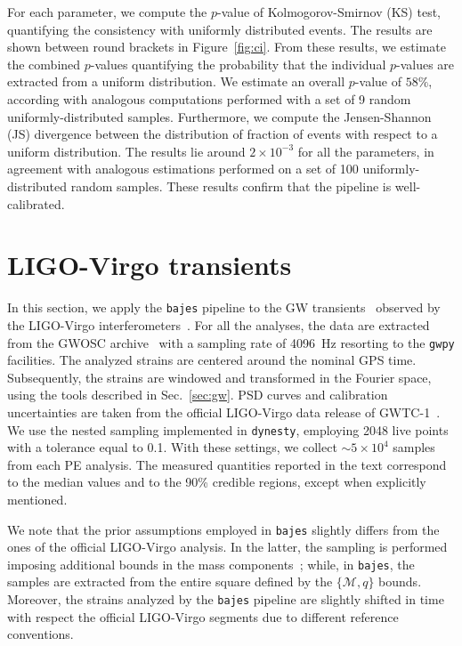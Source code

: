 \documentclass[prd,aps,twocolumn,a4paper,showkeys,nofootinbib,floatfix]{revtex4-1}
\def\M{\mathcal{M}}
\newcommand{\bajes}{{\tt bajes}}
\begin{document}
For each parameter, we compute the $p$-value of
Kolmogorov-Smirnov (KS) test, quantifying the consistency with
uniformly distributed events.
The results are shown between round brackets in Figure~\ref{fig:ci}.
From these results, we estimate the combined $p$-values
quantifying the probability that the individual $p$-values are extracted from a 
uniform distribution. We estimate an overall $p$-value of $58\%$,
according with analogous computations performed with a set of
9 random uniformly-distributed samples.
Furthermore, we compute the Jensen-Shannon (JS) divergence
 between the distribution of fraction of events with respect to 
a uniform distribution. The results lie around $2\times 10^{-3}$ for all the parameters,
in agreement with analogous estimations performed 
on a set of 100 uniformly-distributed random samples. 
These results confirm that the pipeline is well-calibrated.


\section{LIGO-Virgo transients} 
\label{sec:lvc}

In this section, we apply the {\bajes} pipeline to the 
GW transients~\cite{LIGOScientific:2018mvr} observed by the LIGO-Virgo interferometers~\cite{Aasi:2013wya,TheLIGOScientific:2014jea,TheVirgo:2014hva}.
For all the analyses, the data are extracted from the GWOSC archive~\cite{Abbott:2019ebz,Trovato:2019liz,gwosc}
with a sampling rate of 4096~Hz resorting to the {\tt gwpy} facilities.
The analyzed strains are centered around the nominal GPS time.
Subsequently, the strains are windowed and transformed in the Fourier space,
using the tools described in Sec.~\ref{sec:gw}.
PSD curves and calibration uncertainties are taken from the official 
LIGO-Virgo data release of GWTC-1~\cite{LIGOScientific:2018mvr, gwtc_psd, gwtc_cal}.
We use the nested sampling 
implemented in {\tt dynesty}, 
employing 2048 live points with a tolerance equal to 0.1.
With these settings, we collect ${\sim}5\times10^4$ samples
from each PE analysis.
The measured quantities reported in the text correspond to 
the median values and to the 90\% credible regions,
except when explicitly mentioned.

We note that 
the prior assumptions employed in {\bajes} 
slightly differs from the ones of the official LIGO-Virgo
analysis. In the latter, 
the sampling is performed imposing 
additional bounds in the mass components~\cite{Abbott:2016blz,Abbott:2016izl,TheLIGOScientific:2017qsa,Abbott:2018exr}; while, in {\bajes},
the samples are extracted from the entire square defined by the $\{\M,q\}$ bounds.
Moreover, the strains analyzed by the {\bajes} pipeline are slightly
shifted in time with respect the
official LIGO-Virgo segments due to different reference conventions.
\end{document}

